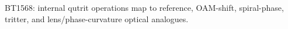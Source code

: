 \begin{center}\small
BT1568: internal qutrit operations map to reference, OAM-shift, spiral-phase, tritter, and lens/phase-curvature optical analogues.
\end{center}
